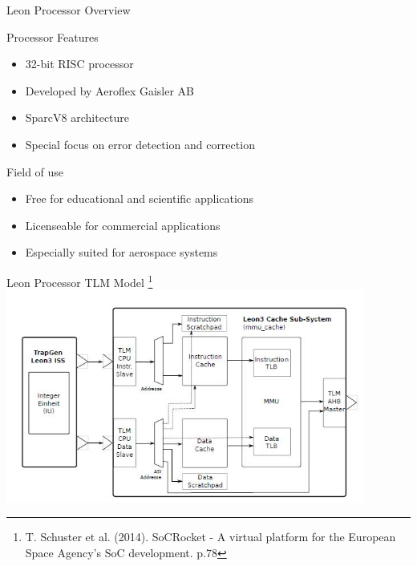 \begin{frame}{Leon Processor Overview}
    \begin{block}{Processor Features}
      \begin{itemize}
        \item 32-bit RISC processor
        \item Developed by Aeroflex Gaisler AB
        \item SparcV8 architecture
        \item Special focus on error detection and correction
      \end{itemize} 

    \end{block} \pause
    
    \begin{block}{Field of use}
      \begin{itemize}
        \item Free for educational and scientific applications
        \item Licenseable for commercial applications
        \item Especially suited for aerospace systems
      \end{itemize} 

    \end{block}

\end{frame}

\begin{frame}{Leon Processor TLM Model \footnote{T. Schuster et al. (2014). SoCRocket - A virtual platform for the European Space Agency's SoC development. p.78}}
   \includegraphics[height=7cm]{pictures/leonTlmModel.JPG}
\end{frame}


